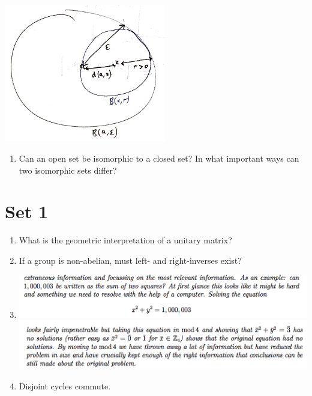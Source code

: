 \documentclass[12pt]{article}
\begin{document}
\begin{enumerate}
\begin{mdframed}
    \includegraphics[width=200pt]{img/questions-oxford-a2-ball-is-open-proof-diagram.png}
  \end{mdframed}
\end{enumerate}

\begin{enumerate}
\item Can an open set be isomorphic to a closed set? In what important ways can two isomorphic sets
  differ?
\end{enumerate}

\section*{Set 1}
\begin{enumerate}
\item What is the geometric interpretation of a unitary matrix?
\item If a group is non-abelian, must left- and right-inverses exist?
\item
  \begin{mdframed}
    \includegraphics[width=400pt]{img/questions-groups-solve-eqn-mod-4-1.png}
    \includegraphics[width=400pt]{img/questions-groups-solve-eqn-mod-4-2.png}
  \end{mdframed}
\item Disjoint cycles commute.
\end{enumerate}
\end{document}
